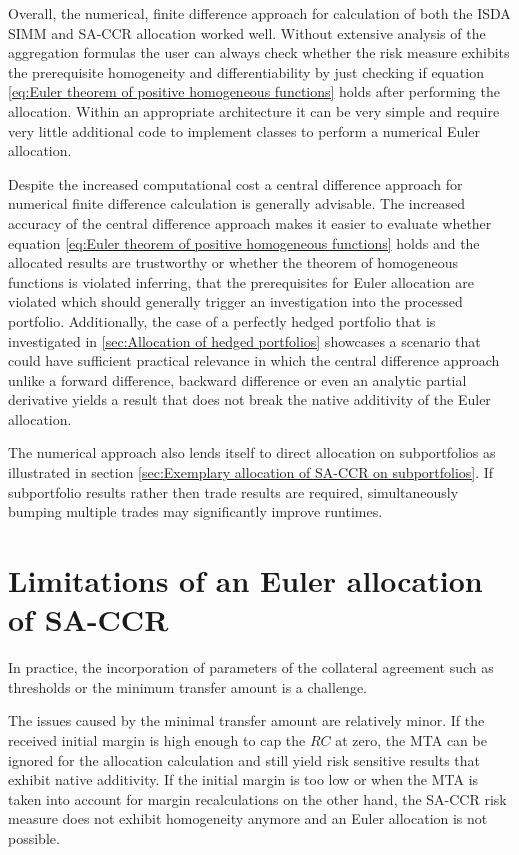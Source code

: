 \documentclass[../Thesis_AHoecherl.tex]{subfiles}
\begin{document}
    Overall, the numerical, finite difference approach for calculation of both the ISDA SIMM and SA-CCR allocation worked well. Without extensive analysis of the aggregation formulas the user can always check whether the risk measure exhibits the prerequisite homogeneity and differentiability by just checking if equation \ref{eq:Euler theorem of positive homogeneous functions} holds after performing the allocation. 
    Within an appropriate architecture it can be very simple and require very little additional code to implement classes to perform a numerical Euler allocation.
    
    Despite the increased computational cost a central difference approach for numerical finite difference calculation is generally advisable.
    The increased accuracy of the central difference approach makes it easier to evaluate whether equation \ref{eq:Euler theorem of positive homogeneous functions} holds and the allocated results are trustworthy or whether the theorem of homogeneous functions is violated inferring, that the prerequisites for Euler allocation are violated which should generally trigger an investigation into the processed portfolio.
    Additionally, the case of a perfectly hedged portfolio that is investigated in \ref{sec:Allocation of hedged portfolios} showcases a scenario that could have sufficient practical relevance in which the central difference approach unlike a forward difference, backward difference or even an analytic partial derivative yields a result that does not break the native additivity of the Euler allocation.

    The numerical approach also lends itself to direct allocation on subportfolios as illustrated in section \ref{sec:Exemplary allocation of SA-CCR on subportfolios}.
    If subportfolio results rather then trade results are required, simultaneously bumping multiple trades may significantly improve runtimes.

    \section{Limitations of an Euler allocation of SA-CCR\label{Limitations of an Euler allocation of SA-CCR}}

    In practice, the incorporation of parameters of the collateral agreement such as thresholds or the minimum transfer amount is a challenge.

    The issues caused by the minimal transfer amount are relatively minor.
    If the received initial margin is high enough to cap the $RC$ at zero, the MTA can be ignored for the allocation calculation and still yield risk sensitive results that exhibit native additivity. If the initial margin is too low or when the MTA is taken into account for margin recalculations on the other hand, the SA-CCR risk measure does not exhibit homogeneity anymore and an Euler allocation is not possible.
    
\end{document}
